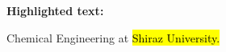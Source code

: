 \documentclass[12pt]{article}
\begin{document}
  
                  \begin{center}  
                     \textbf{\color{red} Highlighted text:} 
                  \end{center}  
                Chemical Engineering at \hl{Shiraz University.}  
           
\end{document}
